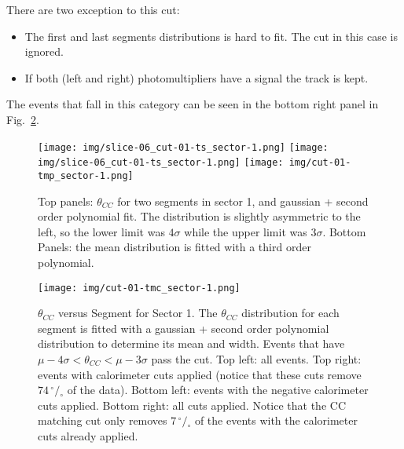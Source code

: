 There are two exception to this cut:
\begin{itemize}
 \item [1.] The first and last segments distributions is hard to fit. The cut in this case is ignored.
 \item [2.] If both (left and right) photomultipliers have a signal the track is kept.
\end{itemize}
The events that fall in this category can be seen in the bottom right panel in Fig.~\ref{fig:ccm_theta}.

\begin{figure}[ht]
  \centering
		\texttt{[image: img/slice-06\_cut-01-ts\_sector-1.png]}
		\texttt{[image: img/slice-06\_cut-01-ts\_sector-1.png]}
		\texttt{[image: img/cut-01-tmp\_sector-1.png]}
		\caption{Top panels: $\theta_{CC}$ for two segments in sector 1, and gaussian + second order
			     polynomial fit. The distribution is slightly asymmetric to the
                 left, so the lower limit was $4\sigma$ while the upper limit
                 was $3\sigma$.
                 Bottom Panels: the mean distribution is fitted with a third order
                 polynomial.  }
 		\label{fig:ccm_slices}
\end{figure}


\begin{figure}[ht]
  \centering
		\texttt{[image: img/cut-01-tmc\_sector-1.png]}
		\caption{$\theta_{CC}$ versus Segment for Sector 1. The $\theta_{CC}$
               distribution for each segment is fitted with a gaussian +
               second order polynomial distribution to determine its mean
               and width. Events that have $\mu - 4\sigma < \theta_{CC} < \mu - 3\sigma$
               pass the cut.
               Top left: all events. Top right: events with calorimeter cuts applied
               (notice that these cuts remove $74 \,^{\circ\!\!}/\!_\circ$ of the data).
               Bottom left: events with the negative calorimeter cuts applied.
               Bottom right: all cuts applied. Notice that the CC matching cut
               only removes $7  \,^{\circ\!\!}/\!_\circ$ of the events with
               the calorimeter cuts already applied.}
 		\label{fig:ccm_theta}
\end{figure}
